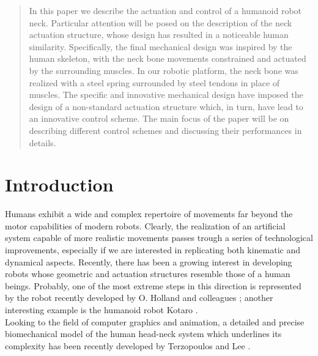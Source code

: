 \documentclass[conference]{IEEEtran}
\numberwithin{equation}{section}
\begin{document}

\maketitle

\begin{abstract}
In this paper we describe the actuation and control of a humanoid robot neck. Particular attention will be posed on the description of the neck actuation structure, whose design has resulted in a noticeable human similarity. Specifically, the final mechanical design was inspired by the human skeleton, with the neck bone movements constrained and actuated by the surrounding muscles. In our robotic platform, the neck bone was realized with a steel spring surrounded by steel tendons in place of muscles. The specific and innovative mechanical design have imposed the design of a non-standard actuation structure which, in turn, have lead to an innovative control scheme. The main focus of the paper will be on describing different control schemes and discussing their performances in details.
\end{abstract}


%
\IEEEpeerreviewmaketitle



\section{Introduction}

Humans exhibit a wide and complex repertoire of movements far beyond the motor capabilities of modern robots. Clearly, the
realization of an artificial system capable of more realistic movements passes trough a series of technological improvements,
especially if we are interested in replicating both kinematic and dynamical aspects. Recently, there has been a growing interest in developing robots whose geometric and actuation structures resemble those of a human beings. Probably, one of the most extreme steps in this direction is represented by the robot recently developed by O. Holland and colleagues \cite{Cronos}; another interesting example is the humanoid robot Kotaro \cite{Kotaro}.\\Looking to the field of computer graphics and animation, a detailed and precise biomechanical model of the human head-neck system which underlines its complexity has been recently developed by Terzopoulos and Lee \cite{Terzopoulos06}.
\end{document}
